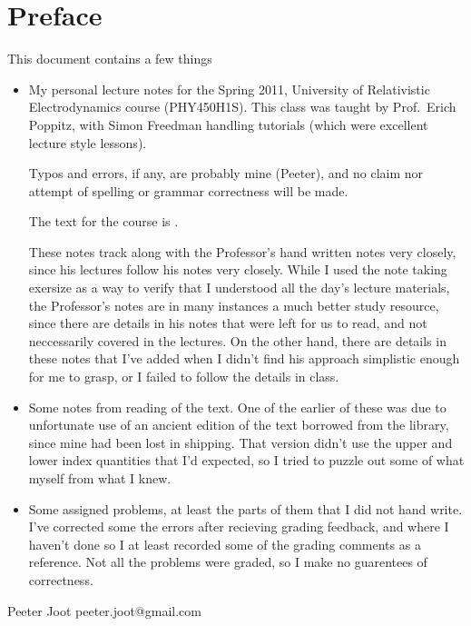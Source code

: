 \chapter*{Preface}\normalsize

This document contains a few things

\begin{itemize}
\item My personal lecture notes for the Spring 2011, University of Relativistic Electrodynamics course (PHY450H1S).  This class was taught by Prof.\ Erich Poppitz, with Simon Freedman handling tutorials (which were excellent lecture style lessons).

Typos and errors, if any, are probably mine (Peeter), and no claim nor attempt of spelling or grammar correctness will be made.  

The text for the course is \cite{landau1980classical}.

These notes track along with the Professor's hand written notes very closely, since his lectures follow his notes very closely.  While I used the note taking exersize as a way to verify that I understood all the day's lecture materials, the Professor's notes are in many instances a much better study resource, since there are details in his notes that were left for us to read, and not neccessarily covered in the lectures.  On the other hand, there are details in these notes that I've added when I didn't find his approach simplistic enough for me to grasp, or I failed to follow the details in class.

\item Some notes from reading of the text.  One of the earlier of these was due to unfortunate use of an ancient edition of the text borrowed from the library, since mine had been lost in shipping.  That version didn't use the upper and lower index quantities that I'd expected, so I tried to puzzle out some of what myself from what I knew.

\item Some assigned problems, at least the parts of them that I did not hand write.  I've corrected some the errors after recieving grading feedback, and where I haven't done so I at least recorded some of the grading comments as a reference.  Not all the problems were graded, so I make no guarentees of correctness.

%
\end{itemize}

Peeter Joot  \quad peeter.joot@gmail.com 
